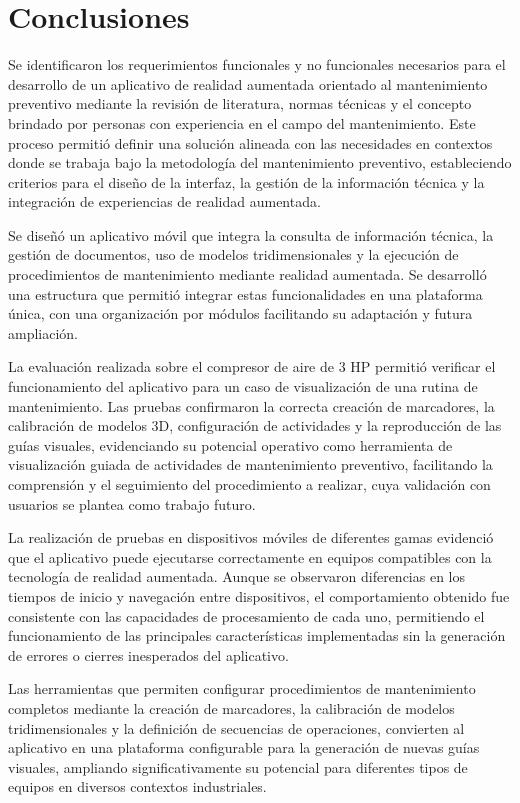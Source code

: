 \section{Conclusiones}

    Se identificaron los requerimientos funcionales y no funcionales necesarios para el desarrollo de un aplicativo de realidad aumentada orientado al mantenimiento preventivo mediante la revisión de literatura, normas técnicas y el concepto brindado por personas con experiencia en el campo del mantenimiento. Este proceso permitió definir una solución alineada con las necesidades en contextos donde se trabaja bajo la metodología del mantenimiento preventivo, estableciendo criterios para el diseño de la interfaz, la gestión de la información técnica y la integración de experiencias de realidad aumentada.

    Se diseñó un aplicativo móvil que integra la consulta de información técnica, la gestión de documentos, uso de modelos tridimensionales y la ejecución de procedimientos de mantenimiento mediante realidad aumentada. Se desarrolló una estructura que permitió integrar estas funcionalidades en una plataforma única, con una organización por módulos facilitando su adaptación y futura ampliación. 

    La evaluación realizada sobre el compresor de aire de 3 HP permitió verificar el funcionamiento del aplicativo para un caso de visualización de una rutina de mantenimiento. Las pruebas confirmaron la correcta creación de marcadores, la calibración de modelos 3D, configuración de actividades y la reproducción de las guías visuales, evidenciando su potencial operativo como herramienta de visualización guiada de actividades de mantenimiento preventivo, facilitando la comprensión y el seguimiento del procedimiento a realizar, cuya validación con usuarios se plantea como trabajo futuro. 
    
    La realización de pruebas en dispositivos móviles de diferentes gamas evidenció que el aplicativo puede ejecutarse correctamente en equipos compatibles con la tecnología de realidad aumentada. Aunque se observaron diferencias en los tiempos de inicio y navegación entre dispositivos, el comportamiento obtenido fue consistente con las capacidades de procesamiento de cada uno, permitiendo el funcionamiento de las principales características implementadas sin la generación de errores o cierres inesperados del aplicativo.

    Las herramientas que permiten configurar procedimientos de mantenimiento completos mediante la creación de marcadores, la calibración de modelos tridimensionales y la definición de secuencias de operaciones, convierten al aplicativo en una plataforma configurable para la generación de nuevas guías visuales, ampliando significativamente su potencial para diferentes tipos de equipos en diversos contextos industriales.